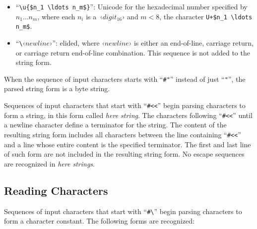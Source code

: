 \begin{itemize}
  \item ``\lstinline!\u{$n_1 \ldots n_m$}!'': Unicode for the hexadecimal number specified by $n_1 \ldots n_m$, where each $n_i$ is a~‹$digit_{16}$› and $m < 8$, the character \lstinline!U+$n_1 \ldots n_m$!.
  
  
  \item ``\lstinline!\!‹$newline$›'': elided, where ‹$newline$› is either an end-of-line, carriage return, or carriage return end-of-line combination. This sequence is not added to the string form.
\end{itemize}

When the sequence of input characters starts with ``\lstinline!#"!'' instead of just ``\lstinline!"!'', the parsed string form is a byte string. %

Sequences of input characters that start with ``\lstinline!#<<!'' begin parsing characters to form a string, in this form called {\em here string}. The characters following ``\lstinline!#<<!'' until a newline character define a terminator for the string. The content of the resulting string form includes all characters between the line containing ``\lstinline!#<<!'' and a line whose entire content is the specified terminator. The first and last line of such form are not included in the resulting string form. No escape sequences are recognized in {\em here strings}. %





\subsection{Reading Characters}
\label{subsec:aml-base-lang-reader-characters}

Sequences of input characters that start with ``\lstinline!#\!'' begin parsing characters to form a character constant. The following forms are recognized:

